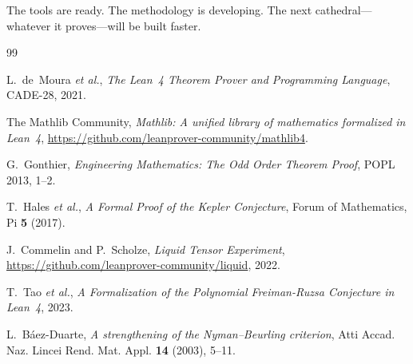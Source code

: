 \documentclass[11pt,a4paper]{article}
\begin{document}
The tools are ready. The methodology is developing. The next
cathedral---whatever it proves---will be built faster.




\begin{thebibliography}{99}

L.~de~Moura \emph{et al.}, \emph{The Lean~4 Theorem Prover and Programming
Language}, CADE-28, 2021.

The Mathlib Community, \emph{Mathlib: A unified library of mathematics
formalized in Lean~4}, \url{https://github.com/leanprover-community/mathlib4}.

G.~Gonthier, \emph{Engineering Mathematics: The Odd Order Theorem Proof},
POPL 2013, 1--2.

T.~Hales \emph{et al.}, \emph{A Formal Proof of the Kepler Conjecture},
Forum of Mathematics, Pi \textbf{5} (2017).

J.~Commelin and P.~Scholze, \emph{Liquid Tensor Experiment},
\url{https://github.com/leanprover-community/liquid}, 2022.

T.~Tao \emph{et al.}, \emph{A Formalization of the Polynomial
Freiman-Ruzsa Conjecture in Lean~4}, 2023.

L.~B\'aez-Duarte, \emph{A strengthening of the Nyman--Beurling criterion},
Atti Accad. Naz. Lincei Rend. Mat. Appl. \textbf{14} (2003), 5--11.

\end{thebibliography}
\end{document}

